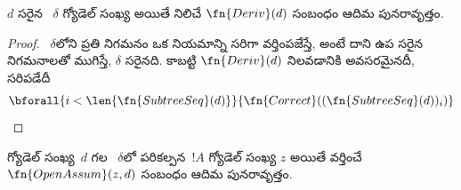 \documentclass[../../../include/open-logic-section]{subfiles}
\begin{document}
\begin{prop}
  $d$ సరైన ~$\delta$ గ్యోడెల్ సంఖ్య
  అయితే నిలిచే $\fn{Deriv}(d)$ సంబంధం ఆదిమ పునరావృత్తం.
\end{prop}

\begin{proof}
  ~$\delta$లోని ప్రతి నిగమనం
  ఒక నియమాన్ని సరిగా వర్తింపజేస్తే, అంటే దాని
  ఉప సరైన నిగమనాలతో ముగిస్తే,
  $\delta$ సరైనది. కాబట్టి $\fn{Deriv}(d)$ నిలవడానికి అవసరమైనదీ, సరిపడేదీ
  \[
  \bforall{i<\len{\fn{SubtreeSeq}(d)}}{\fn{Correct}((\fn{SubtreeSeq}(d))_i)}
  \]
\end{proof}

\begin{prop}
   గ్యోడెల్ సంఖ్య~$d$ గల
  ~$\delta$లో
   పరికల్పన~$!A$ గ్యోడెల్
సంఖ్య $z$ అయితే వర్తించే $\fn{OpenAssum}(z,d)$ సంబంధం ఆదిమ పునరావృత్తం.
\end{prop}
\end{document}
